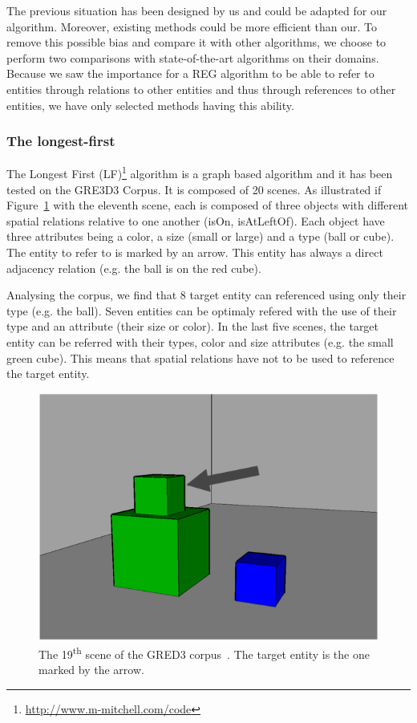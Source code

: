The previous situation has been designed by us and could be adapted for our algorithm. Moreover, existing methods could be more efficient than our. To remove this possible bias and compare it with other algorithms, we choose to perform two comparisons with state-of-the-art algorithms on their domains. Because we saw the importance for a REG algorithm to be able to refer to entities through relations to other entities and thus through references to other entities, we have only selected methods having this ability.

\subsubsection{The longest-first}

The Longest First (LF)\footnote{\url{http://www.m-mitchell.com/code}} algorithm \cite{viethen_2013_graphs} is a graph based algorithm and it has been tested on the GRE3D3 Corpus. It is composed of 20 scenes. As illustrated if Figure~\ref{fig:chap4_gred3} with the eleventh scene, each is composed of three objects with different spatial relations relative to one another (isOn, isAtLeftOf). Each object have three attributes being a color, a size (small or large) and a type (ball or cube). The entity to refer to is marked by an arrow. This entity has always a direct adjacency relation (e.g. the ball is on the red cube).

Analysing the corpus, we find that 8 target entity can referenced using only their type (e.g. the ball). Seven entities can be optimaly refered with the use of their type and an attribute (their size or color). In the last five scenes, the target entity can be referred with their types, color and size attributes (e.g. the small green cube). This means that spatial relations have not to be used to reference the target entity. 

\begin{figure}[h!]
\centering
\includegraphics[scale=0.3]{figures/chapter4/GRED3.jpg}
\caption{\label{fig:chap4_gred3} The 19\textsuperscript{th} scene of the GRED3 corpus~\cite{dale_2009_referring}. The target entity is the one marked by the arrow.}
\end{figure}

